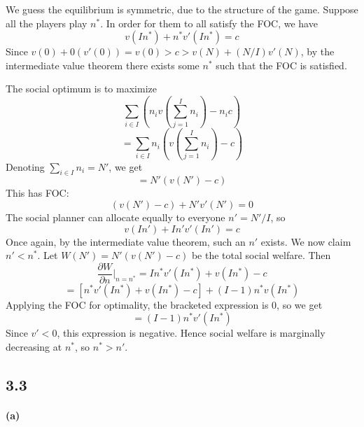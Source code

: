 \documentclass[10pt,letter]{article}
\begin{document}
We guess the equilibrium is symmetric, due to the structure of the game. Suppose all the players play $n^*$. In order for them to all satisfy the FOC, we have
\[ v(In^*) + n^* v'(In^*) = c \]
Since $v(0) + 0(v'(0)) = v(0) > c > v(N) + (N/I)v'(N)$, by the intermediate value theorem there exists some $n^*$ such that the FOC is satisfied.

The social optimum is to maximize
\[ \sum_{i \in I} \left(n_i v\left(\sum_{j=1}^I n_i \right) - n_i c\right)  \]
\[ =  \sum_{i \in I} n_i \left( v\left(\sum_{j=1}^I n_i \right) - c\right)  \]
Denoting $\sum_{i \in I} n_i = N'$, we get
\[ =N' (v(N') - c) \]
This has FOC:
\[ (v(N') - c) + N'v'(N') = 0 \]
The social planner can allocate equally to everyone $n' = N'/I$, so
\[ v(In') + In' v'(In') = c \]
Once again, by the intermediate value theorem, such an $n'$  exists. We now claim $n' < n^*$. Let $W(N')  = N'(v(N') - c)$ be the total social welfare. Then
\[ \frac{\partial W}{\partial n}\Bigr|_{n = n^*} = In^*v'(In^*) + v(In^*) - c \]
\[ = [n^*v'(In^*) + v(In^*) - c] + (I-1)n^*v(In^*) \]
Applying the FOC for optimality, the bracketed expression is 0, so we get
\[ =  (I-1)n^*v'(In^*) \]
Since $v' < 0$, this expression is negative. Hence social welfare is marginally decreasing at $n^*$, so $n^* > n'$.

\subsection*{3.3}
\paragraph{(a)}
\end{document}
